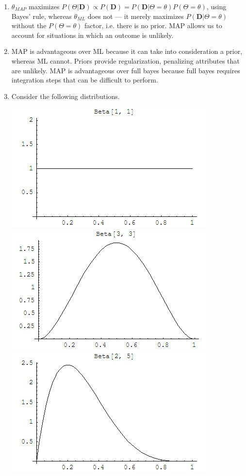 \documentclass{article}
\begin{document}
\begin{enumerate}
\item $\theta_{MAP}$ maximizes $P(\Theta|\mathbf D)\propto P(\mathbf
  D)=P(\mathbf D | \Theta = \theta)P(\Theta = \theta)$, using Bayes'
  rule, whereas $\theta_{ML}$ does not --- it merely maximizes
  $P(\mathbf D | \Theta = \theta)$ without the $P(\Theta=\theta)$
  factor, i.e. there is no prior. MAP allows us to account for
  situations in which an outcome is unlikely.
\item MAP is advantageous over ML because it can take into
  consideration a prior, whereas ML cannot. Priors provide
  regularization, penalizing attributes that are unlikely.  MAP is
  advantageous over full bayes because full bayes requires integration
  steps that can be difficult to perform.
\item
  Consider the following distributions.
  \begin{center}
    \includegraphics[scale=.35]{beta_1_1.png}
    \includegraphics[scale=.35]{beta_3_3.png}
    \includegraphics[scale=.35]{beta_2_5.png}

\end{center}
\end{enumerate}
\end{document}
